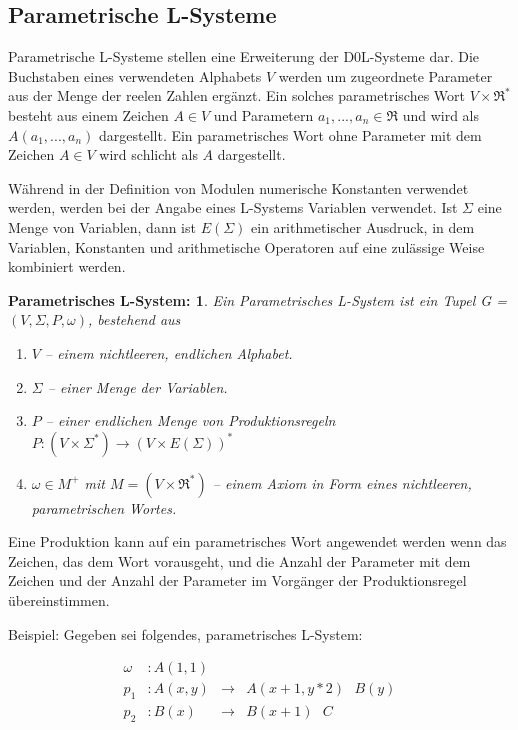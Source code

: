 \subsection{Parametrische L-Systeme}

Parametrische L-Systeme stellen eine Erweiterung der D0L-Systeme dar. Die Buchstaben eines verwendeten Alphabets $V$ werden um zugeordnete Parameter aus der Menge der reelen Zahlen ergänzt. Ein solches parametrisches Wort $V \times \Re^*$ besteht aus einem Zeichen $A \in V$ und Parametern $a_1,...,a_n \in \Re$ und wird als $A(a_1,...,a_n)$ dargestellt. Ein parametrisches Wort ohne Parameter mit dem Zeichen $A \in V$  wird schlicht als $A$ dargestellt. \cite[S.41]{ABOP:04}

Während in der Definition von Modulen numerische Konstanten verwendet werden, werden bei der Angabe eines L-Systems Variablen verwendet. Ist $\Sigma$ eine Menge von Variablen, dann ist $E(\Sigma)$ ein arithmetischer Ausdruck, in dem Variablen, Konstanten und arithmetische Operatoren auf eine zulässige Weise kombiniert werden. \cite[S.41]{ABOP:04}

\newtheorem{defParametrischeLSysteme}{Parametrisches L-System:}[section]
\begin{defParametrischeLSysteme}
	Ein Parametrisches L-System ist ein Tupel G = $(V, \Sigma, P, \omega)$, bestehend aus
	\begin{enumerate}
		\item $V$ -- einem nichtleeren, endlichen Alphabet.
		\item $\Sigma$ -- einer Menge der Variablen.
		\item $P$ -- einer endlichen Menge von Produktionsregeln $P : (V\times \Sigma^*) \rightarrow (V\times E(\Sigma))^*$
		\item $\omega \in M^+$ mit $M =(V \times \Re^*)$ -- einem Axiom in Form eines nichtleeren, parametrischen Wortes.
	\end{enumerate}
\cite[S.41]{ABOP:04}
\end{defParametrischeLSysteme}

Eine Produktion kann auf ein parametrisches Wort angewendet werden wenn das Zeichen, das dem Wort vorausgeht, und die Anzahl der Parameter mit dem Zeichen und der Anzahl der Parameter im Vorgänger der Produktionsregel übereinstimmen. \cite[S.42]{ABOP:04}

Beispiel: Gegeben sei folgendes, parametrisches L-System:

\begin{equation}
\begin{array}{llll}
\omega & : A(1,1) \\
p_1 & : A(x,y) &\rightarrow& A(x+1, y*2)\text{ }B(y) \\
p_2 &  : B(x) &\rightarrow& B(x+1)\text{ }C 
\end{array}
\label{eq:ProdParamLSystem}
\end{equation} 

